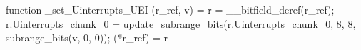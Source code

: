 function _set_Uinterrupts_UEI (r_ref, v) = {
    r = __bitfield_deref(r_ref);
    r.Uinterrupts_chunk_0 = update_subrange_bits(r.Uinterrupts_chunk_0, 8, 8, subrange_bits(v, 0, 0));
    (*r_ref) = r
}
